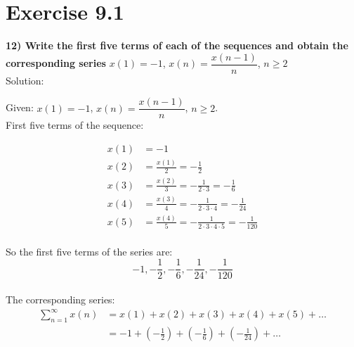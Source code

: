 \documentclass[journal,12pt,twocolumn]{IEEEtran}
\begin{document}


\vspace{3cm}

\title{}
\author{EE23BTECH11217 - Prajwal M$^{*}$
}
\maketitle
\newpage
\bigskip

\renewcommand{\thefigure}{\theenumi}
\renewcommand{\thetable}{\theenumi}

\section*{Exercise 9.1}

\noindent \textbf{12) \hspace{2pt}Write the first five terms of each of the sequences and obtain the corresponding series}
$x(1) = -1$, $x(n) = \dfrac{x({n-1})}{n}$, $n \geq 2$\\

\noindent Solution: 

\noindent Given: $x(1) = -1$, $x(n) = \dfrac{x({n-1})}{n}$, $n \geq 2$. \\

First five terms of the sequence:

\begin{align*}
x(1) & = -1 \\
x(2) & = \frac{x(1)}{2} = -\frac{1}{2} \\
x(3) & = \frac{x(2)}{3} = -\frac{1}{2 \cdot 3} = -\frac{1}{6}\\
x(4) & = \frac{x(3)}{4} = -\frac{1}{2 \cdot 3 \cdot 4} = -\frac{1}{24}\\
x(5) & = \frac{x(4)}{5} = -\frac{1}{2 \cdot 3 \cdot 4 \cdot 5} = -\frac{1}{120}
\end{align*} \\

So the first five terms of the series are: 
$$-1 , -\frac{1}{2}, -\frac{1}{6}, -\frac{1}{24},  -\frac{1}{120}$$ \\

The corresponding series:
\begin{align*}
    \sum_{n=1}^{\infty} x(n) & = x(1) + x(2) + x(3) + x(4) + x(5) + \ldots \\
    & = -1 + \left(-\frac{1}{2}\right) + \left(-\frac{1}{6}\right) + \left(-\frac{1}{24}\right) + \ldots \\ 
\end{align*}
\end{document}
